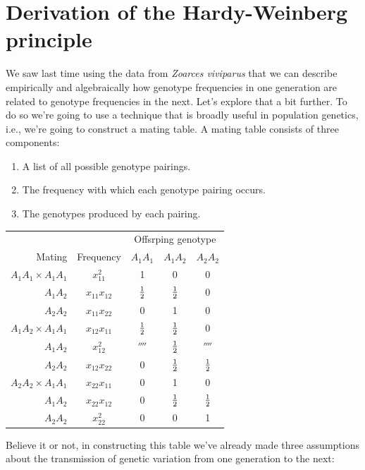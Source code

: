 \documentclass[12pt]{article}
\begin{document}
\section*{Derivation of the Hardy-Weinberg principle}

We saw last time using the data from {\it Zoarces viviparus\/} that we
can describe empirically and algebraically how genotype frequencies in
one generation are related to genotype frequencies in the next. Let's
explore that a bit further. To do so we're going to use a technique
that is broadly useful in population genetics, i.e., we're going to
construct a mating table. A mating table consists of three
components:

\begin{enumerate}

\item A list of all possible genotype pairings.

\item The frequency with which each genotype pairing occurs.

\item The genotypes produced by each pairing.

\end{enumerate}

\begin{center}
\begin{tabular}{rcccc}
\hline\hline
                       &           & \multicolumn{3}{c}{Offsrping genotype} \\
Mating                 & Frequency     & $A_1A_1$ & $A_1A_2$ & $A_2A_2$ \\
\hline
$A_1A_1 \times A_1A_1$ & $x_{11}^2$     &        1 &        0 &        0 \\
              $A_1A_2$ & $x_{11}x_{12}$ &    $\frac{1}{2}$ &    $\frac{1}{2}$ &        0 \\
              $A_2A_2$ & $x_{11}x_{22}$ &        0 &        1 &        0 \\
$A_1A_2 \times A_1A_1$ & $x_{12}x_{11}$ &    $\frac{1}{2}$ &    $\frac{1}{2}$ &        0 \\ 
              $A_1A_2$ & $x_{12}^2$     &  $\fourth$ &    $\frac{1}{2}$ &  $\fourth$ \\
              $A_2A_2$ & $x_{12}x_{22}$ &        0 &    $\frac{1}{2}$ &    $\frac{1}{2}$ \\
$A_2A_2 \times A_1A_1$ & $x_{22}x_{11}$ &        0 &        1 &        0 \\
              $A_1A_2$ & $x_{22}x_{12}$ &        0 &    $\frac{1}{2}$ &    $\frac{1}{2}$ \\   
              $A_2A_2$ & $x_{22}^2$     &        0 &         0 &
                       1 \\
\hline
\end{tabular}
\end{center}
Believe it or not, in constructing this table we've already made three
assumptions about the transmission of genetic variation from one
generation to the next:
\end{document}
